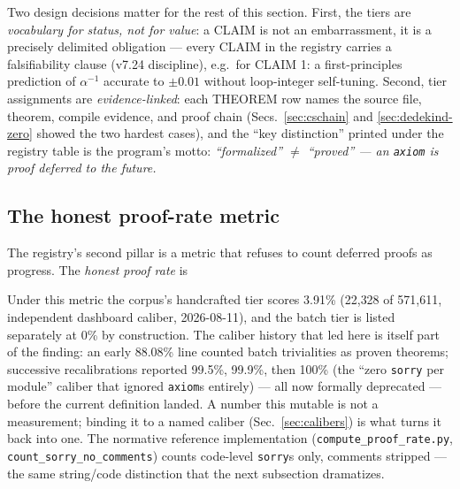 Two design decisions matter for the rest of this section. First,
the tiers are \emph{vocabulary for status, not for value}: a CLAIM
is not an embarrassment, it is a precisely delimited obligation
--- every CLAIM in the registry carries a falsifiability clause
(v7.24 discipline), e.g.\ for CLAIM 1: a first-principles
prediction of $\alpha^{-1}$ accurate to $\pm 0.01$ without
loop-integer self-tuning. Second, tier assignments are
\emph{evidence-linked}: each THEOREM row names the source file,
theorem, compile evidence, and proof chain (Secs.~\ref{sec:cschain}
and \ref{sec:dedekind-zero} showed the two hardest cases), and the
``key distinction'' printed under the registry table is the
program's motto: \emph{``formalized'' $\neq$ ``proved'' --- an
\texttt{axiom} is proof deferred to the future.}

\subsection{The honest proof-rate metric}
\label{sec:metric}
The registry's second pillar is a metric that refuses to count
deferred proofs as progress. The \emph{honest proof rate} is

\begin{center}
\end{center}

Under this metric the corpus's handcrafted tier scores 3.91\%
(22{,}328 of 571{,}611, independent dashboard caliber, 2026-08-11),
and the batch tier is listed separately at 0\% by construction.
The caliber history that led here is itself part of the finding:
an early 88.08\% line counted batch trivialities as proven
theorems; successive recalibrations reported 99.5\%, 99.9\%, then
100\% (the ``zero \texttt{sorry} per module'' caliber that ignored
\texttt{axiom}s entirely) --- all now formally deprecated ---
before the current definition landed. A number this mutable is
not a measurement; binding it to a named caliber
(Sec.~\ref{sec:calibers}) is what turns it back into one. The
normative reference implementation
(\texttt{compute\_proof\_rate.py},
\texttt{count\_sorry\_no\_comments}) counts code-level
\texttt{sorry}s only, comments stripped --- the same string/code
distinction that the next subsection dramatizes.

